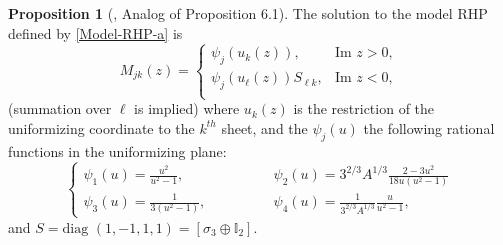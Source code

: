 \documentclass[usenames,dvipsnames]{article}
\theoremstyle{definition}
\newtheorem{prop}{Proposition}[section]
\numberwithin{equation}{section}
\numberwithin{figure}{section}
\begin{document}
\begin{prop}[\cite{DHL1}, Analog of Proposition 6.1]
    The solution to the model RHP defined by \eqref{Model-RHP-a} is
            \begin{equation}
                M_{jk}(z) = \begin{cases}
                    \psi_j(u_k(z)), & \text{Im } z >0,\\
                    \psi_j(u_\ell(z))S_{\ell k}, & \text{Im } z <0,\\
                \end{cases}
            \end{equation}
        (summation over $\ell$ is implied) where $u_k(z)$ is the restriction of the uniformizing coordinate to the $k^{th}$ sheet, and the $\psi_j(u)$ the following rational functions in the uniformizing plane:
        \begin{equation}
        \begin{cases}
            \psi_1(u) = \frac{u^2}{u^2-1}, \qquad & \qquad \psi_2(u) = 3^{2/3}A^{1/3}\frac{2-3u^2}{18u(u^2-1)} \\
            \psi_3(u) = \frac{1}{3(u^2-1)}, \qquad &\qquad \psi_4(u) = \frac{1}{3^{2/3}A^{1/3} }\frac{u}{u^2-1},
        \end{cases}
        \end{equation}
    and $S = \text{diag }(1, -1, 1, 1) = [\sigma_3 \oplus \mathbb{I}_2]$.
    \end{prop}
\end{document}
